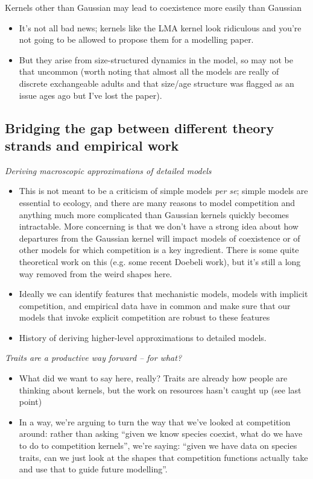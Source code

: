 \documentclass[a4paper,11pt]{article}
\begin{document}
Kernels other than Gaussian may lead to coexistence more easily
  than Gaussian

\begin{itemize}
\item It's not all bad news; kernels like the LMA kernel look
  ridiculous and you're not going to be allowed to propose them for
  a modelling paper.
\item But they arise from size-structured dynamics in the model, so
  may not be that uncommon (worth noting that almost all the models
  are really of discrete exchangeable adults and that size/age
  structure was flagged as an issue ages ago but I've lost the
  paper).
\end{itemize}


\subsection{Bridging the gap between different theory strands and 
empirical work}

\textit{Deriving macroscopic approximations of detailed models}

\begin{itemize}
 \item This is not meant to be a criticism of simple models \textit{per
  se}; simple models are essential to ecology, and there are many
  reasons to model competition and anything much more complicated than
  Gaussian kernels quickly becomes intractable.  More concerning is
  that we don't have a strong idea about how departures from the
  Gaussian kernel will impact models of coexistence or of other models
  for which competition is a key ingredient.  There is some quite
  theoretical work on this (e.g. some recent Doebeli work), but it's
  still a long way removed from the weird shapes here.
\item Ideally we can identify features that mechanistic models, models
  with implicit competition, and empirical data have in common and make
  sure that our models that invoke explicit competition are robust to
  these features
\item History of deriving higher-level approximations to detailed models. 
\end{itemize}

\textit{Traits are a productive way forward -- for what?}

\begin{itemize}
\item What did we want to say here, really?  Traits are already how
  people are thinking about kernels, but the work on resources hasn't
  caught up (see last point)
\item In a way, we're arguing to turn the way that we've looked at
  competition around: rather than asking ``given we know species
  coexist, what do we have to do to competition kernels'', we're
  saying: ``given we have data on species traits, can we just look at
  the shapes that competition functions actually take and use that to
  guide future modelling''.
\end{itemize}
\end{document}
